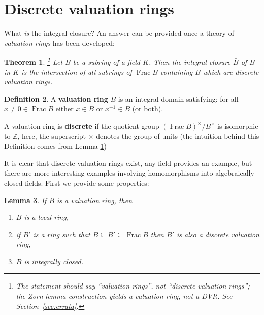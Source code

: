 \documentclass[12pt]{article}
\theoremstyle{plain}
\newtheorem{thm}{Theorem}[subsection] %
\newtheorem{lemma}[thm]{Lemma}
\theoremstyle{definition}
\newtheorem{defn}[thm]{Definition} %
\newcommand{\bb}[1]{\mathbb{#1}}
\begin{document}
\section{Discrete valuation rings}
What \emph{is} the integral closure? An answer can be provided once a theory of \emph{valuation rings} has been developed:
\begin{thm}
\label{thm:discrete_valuation_intersection}\footnote{The statement should say ``valuation rings'', not ``discrete valuation rings''; the Zorn-lemma construction yields a valuation ring, not a DVR. See Section~\ref{sec:errata}.}
Let $B$ be a subring of a field $K$. Then the integral closure $\bar{B}$ of $B$ in $K$ is the intersection of all subrings of $\operatorname{Frac}B$ containing $B$ which are \emph{discrete valuation rings}.
\end{thm}
\begin{defn}
A \textbf{valuation ring} $B$ is an integral domain satisfying: for all $x\neq 0 \in \operatorname{Frac}B$ either $x \in B$ or $x^{-1} \in B$ (or both).

A valuation ring is \textbf{discrete} if the quotient group $(\operatorname{Frac}B)^{\times}/B^\times$ is isomorphic to $\bb{Z}$, here, the superscript $\times$ denotes the group of units (the intuition behind this Definition comes from Lemma \ref{})
\end{defn}
It is clear that discrete valuation rings exist, any field provides an example, but there are more interesting examples involving homomorphisms into algebraically closed fields. First we provide some properties:
\begin{lemma}
If $B$ is a valuation ring, then
\begin{enumerate}
    \item\label{lem:discrete_valuation_local} $B$ is a local ring,
    \item\label{lem:discrete_valuation_between} if $B'$ is a ring such that $B \subseteq B' \subseteq \operatorname{Frac}B$ then $B'$ is also a discrete valuation ring,
    \item\label{lem:discrete_valuation_integrally_closed} $B$ is integrally closed.
\end{enumerate}
\end{lemma}
\end{document}
